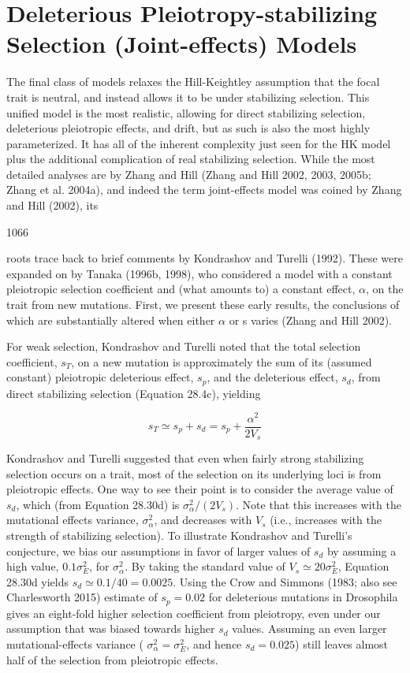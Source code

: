 \documentclass{article}
\begin{document}
\section{Deleterious Pleiotropy-stabilizing Selection (Joint-effects) Models}
The final class of models relaxes the Hill-Keightley assumption that the focal trait is neutral, and instead allows it to be under stabilizing selection. This unified model is the most realistic, allowing for direct stabilizing selection, deleterious pleiotropic effects, and drift, but as such is also the most highly parameterized. It has all of the inherent complexity just seen for the HK model plus the additional complication of real stabilizing selection. While the most detailed analyses are by Zhang and Hill (Zhang and Hill 2002, 2003, 2005b; Zhang et al. 2004a), and indeed the term joint-effects model was coined by Zhang and Hill (2002), its

1066

roots trace back to brief comments by Kondrashov and Turelli (1992). These were expanded on by Tanaka (1996b, 1998), who considered a model with a constant pleiotropic selection coefficient and (what amounts to) a constant effect,  $ \alpha $, on the trait from new mutations. First, we present these early results, the conclusions of which are substantially altered when either  $ \alpha $ or s varies (Zhang and Hill 2002).

For weak selection, Kondrashov and Turelli noted that the total selection coefficient,  $ s_{T} $, on a new mutation is approximately the sum of its (assumed constant) pleiotropic deleterious effect,  $ s_{p} $, and the deleterious effect,  $ s_{d} $, from direct stabilizing selection (Equation 28.4c), yielding

\begin{equation}
s_{T}\simeq s_{p}+s_{d}=s_{p}+\frac{\alpha^{2}}{2V_{s}}
\tag{28.48a}
\label{eq:28_48a}
\end{equation}

Kondrashov and Turelli suggested that even when fairly strong stabilizing selection occurs on a trait, most of the selection on its underlying loci is from pleiotropic effects. One way to see their point is to consider the average value of  $ s_d $, which (from Equation 28.30d) is  $ \sigma_\alpha^2/(2V_s) $. Note that this increases with the mutational effects variance,  $ \sigma_\alpha^2 $, and decreases with  $ V_s $ (i.e., increases with the strength of stabilizing selection). To illustrate Kondrashov and Turelli’s conjecture, we bias our assumptions in favor of larger values of  $ s_d $ by assuming a high value,  $ 0.1\sigma_E^2 $, for  $ \sigma_\alpha^2 $. By taking the standard value of  $ V_s \simeq 20\sigma_E^2 $, Equation 28.30d yields  $ s_d \simeq 0.1/40 = 0.0025 $. Using the Crow and Simmons (1983; also see Charlesworth 2015) estimate of  $ s_p = 0.02 $ for deleterious mutations in Drosophila gives an eight-fold higher selection coefficient from pleiotropy, even under our assumption that was biased towards higher  $ s_d $ values. Assuming an even larger mutational-effects variance ( $ \sigma_\alpha^2 = \sigma_E^2 $, and hence  $ s_d = 0.025 $) still leaves almost half of the selection from pleiotropic effects.
\end{document}
